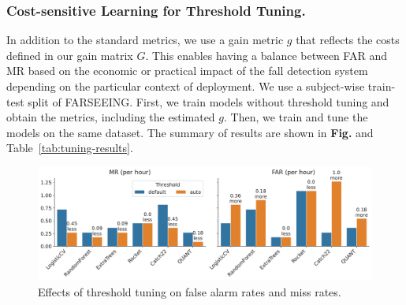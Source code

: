 \documentclass[runningheads]{llncs}
\begin{document}
\subsubsection{Cost-sensitive Learning for Threshold Tuning.}
In addition to the standard metrics, we use a gain metric $g$ that reflects the costs defined in our gain matrix $G$. This enables having a balance between FAR and MR based on the economic or practical impact of the fall detection system depending on the particular context of deployment. We use a subject-wise train-test split of FARSEEING. First, we train models without threshold tuning and obtain the metrics, including the estimated $g$. Then, we train and tune the models on the same dataset. The summary of results are shown in \textbf{Fig.} and Table~\ref{tab:tuning-results}.

\begin{figure}[t]
\includegraphics[width=\textwidth]{img/barplot_tune_threshold.pdf}
\caption{Effects of threshold tuning on false alarm rates and miss rates.} \label{fig:tune-thresh}
\end{figure}
\end{document}

